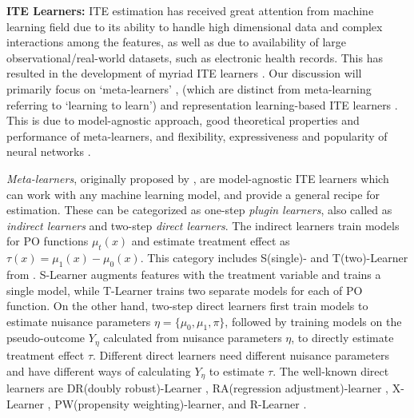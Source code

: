 \documentclass{article}
\begin{document}
\textbf{ITE Learners:} ITE estimation has received great attention from machine learning field due to its ability to handle high dimensional data and complex interactions among the features, as well as due to availability of large observational/real-world datasets, such as electronic health records. This has resulted in the development of myriad ITE learners \cite{johansson2016learning,shalit2017estimating,shi2019adapting,kunzel2019metalearners,curth2021inductive,hassanpour2019counterfactual,tesei2023learning,xue2023assisting,yao2021survey}. Our discussion will primarily focus on `meta-learners' \cite{kunzel2019metalearners}, (which are distinct from meta-learning referring to `learning to learn') and representation learning-based ITE learners \cite{johansson2016learning}. This is due to model-agnostic approach, good theoretical properties and performance of meta-learners, and flexibility, expressiveness and popularity of neural networks \cite{curth2021nonparametric,chauhan2022continuous,chauhan2023brief,chauhan2023hcr}.

\textit{Meta-learners}, originally proposed by \cite{kunzel2019metalearners}, are model-agnostic ITE learners which can work with any machine learning model, and provide a general recipe for estimation. These can be categorized as one-step \textit{plugin learners}, also called as \textit{indirect learners} and two-step \textit{direct learners}. The indirect learners train models for PO functions $\mu_t(x)$ and estimate treatment effect as $\tau(x) = \mu_1(x) - \mu_0(x)$. This category includes S(single)- and T(two)-Learner from \cite{kunzel2019metalearners}. S-Learner augments features with the treatment variable and trains a single model, while T-Learner trains two separate models for each of PO function. On the other hand, two-step direct learners first train models to estimate nuisance parameters $\eta=\{\mu_0, \mu_1, \pi\}$, followed by training models on the pseudo-outcome $Y_{\eta}$ calculated from nuisance parameters $\eta$, to directly estimate treatment effect $\tau$. Different direct learners need different nuisance parameters and have different ways of calculating $Y_{\eta}$ to estimate $\tau$. The well-known direct learners are DR(doubly robust)-Learner \cite{kennedy2022optimal}, RA(regression adjustment)-learner \cite{curth2021nonparametric}, X-Learner \cite{kunzel2019metalearners}, PW(propensity weighting)-learner, and R-Learner \cite{nie2021quasi}.
\end{document}
